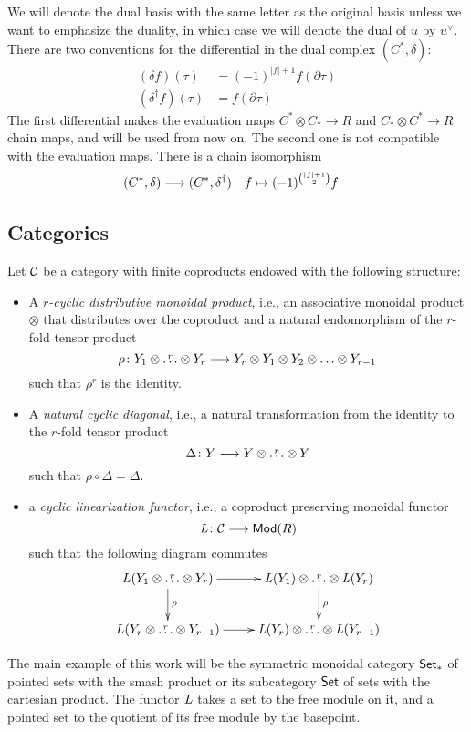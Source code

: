 We will denote the dual basis with the same letter as the original basis unless we want to emphasize the duality, in which case we will denote the dual of $u$ by $u^\vee$. There are two conventions for the differential in the dual complex $(C^*,\delta)$:
\begin{align*}
	(\delta f)(\tau) &= (-1)^{|f|+1} f(\partial \tau) \\
	(\delta^\dagger f)(\tau) &= f(\partial \tau)
\end{align*}
The first differential makes the evaluation maps $C^*\otimes C_*\to R$ and $C_*\otimes C^*\to R$ chain maps, and will be used from now on. The second one is not compatible with the evaluation maps. There is a chain isomorphism
\begin{align*}
	(C^*,\delta) &\longrightarrow (C^*,\delta^\dagger) & f&\mapsto (-1)^{\binom{|f|+1}{2}} f
\end{align*}

\subsection{Categories}

Let $\mathcal{C}$ be a category with finite coproducts endowed with the following structure:
\begin{itemize}
	\item A \emph{$r$-cyclic distributive monoidal product}, i.e., an associative monoidal product $\otimes$ that distributes over the coproduct and a natural endomorphism of the $r$-fold tensor product
	\[
	\rho\colon Y_1\otimes  \overset{r}{\ldots}\otimes Y_r\longrightarrow Y_r\otimes Y_1\otimes Y_2\otimes \ldots \otimes Y_{r-1}
	\]
	such that $\rho^r$ is the identity.
	\item A \emph{natural cyclic diagonal}, i.e., a natural transformation from the identity to the $r$-fold tensor product
	\[
	\Delta\colon Y\longrightarrow Y\otimes \overset{r}{\ldots}\otimes Y
	\]
	such that $\rho\circ \Delta = \Delta$.
	\item a \emph{cyclic linearization functor}, i.e., a coproduct preserving monoidal functor
	\[
	\operatorname{{\it L}}\colon \mathcal{C}\longrightarrow \mathsf{Mod}(R)
	\]
	such that the following diagram commutes
	\[
	\xymatrix{
		L(Y_1\otimes \overset{r}{\ldots} \otimes Y_r)  \ar[r]\ar[d]^{\rho} & \abel(Y_1)\otimes \overset{r}{\ldots} \otimes \abel(Y_r)\ar[d]^{\rho} \\
		L(Y_{r}\otimes \overset{r}{\ldots} \otimes Y_{r-1})  \ar[r] & \abel(Y_r)\otimes \overset{r}{\ldots} \otimes \abel(Y_{r-1}) }
	\]
\end{itemize}
The main example of this work will be the symmetric monoidal category $\mathsf{Set}_*$ of pointed sets with the smash product or its subcategory $\mathsf{Set}$ of sets with the cartesian product. The functor $\operatorname{{\it L}}$ takes a set to the free module on it, and a pointed set to the quotient of its free module by the basepoint.

